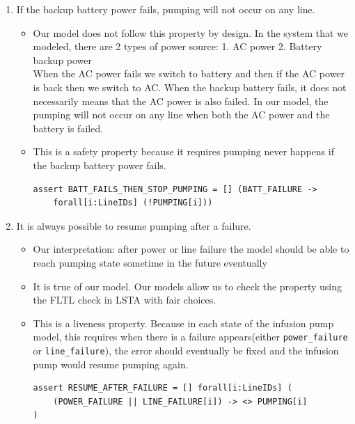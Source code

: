 \documentclass[titlepage]{article}
\begin{document}
\begin{enumerate}
\item If the backup battery power fails, pumping will not occur on any line.
    \begin{itemize}
    \item Our model does not follow this property by design. In the system that we modeled, there are 2 types of power source: 
    1. AC power
    2. Battery backup power\\
    When the AC power fails we switch to battery and then if the AC power is back then we switch to AC. When the backup battery fails, it does not necessarily means that the AC power is also failed. In our model, the pumping will not occur on any line when both the AC power and the battery is failed.
    \item This is a safety property because it requires pumping never happens if the backup battery power fails.
    \begin{verbatim}
assert BATT_FAILS_THEN_STOP_PUMPING = [] (BATT_FAILURE ->
    forall[i:LineIDs] (!PUMPING[i]))
    \end{verbatim}
 \end{itemize}

\item It is always possible to resume pumping after a failure.
    \begin{itemize}
        \item Our interpretation: after power or line failure the model should be able to reach pumping state sometime in the future eventually
        \item It is true of our model. Our models allow us to check the property using the FLTL check in LSTA with fair choices.
        \item This is a liveness property. 
        Because in each state of the infusion pump model, this requires when there is a failure appears(either \texttt{power\_failure} or \texttt{line\_failure}), the error should eventually be fixed and the infusion pump would resume pumping again.
        \begin{verbatim}
assert RESUME_AFTER_FAILURE = [] forall[i:LineIDs] (
    (POWER_FAILURE || LINE_FAILURE[i]) -> <> PUMPING[i]
)
        \end{verbatim}
    \end{itemize}


\end{enumerate}
\end{document}
